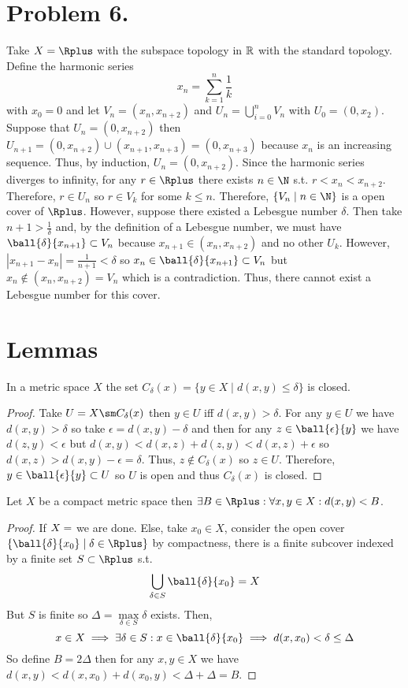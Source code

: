\documentclass[12pt]{extarticle}
\begin{document}
\section*{Problem 6.}
Take $X = \Rplus$ with the subspace topology in $\mathbb{R}$ with the standard topology. Define the harmonic series \[x_n = \sum_{k = 1}^n \frac{1}{k}\]
with $x_0 = 0$ and let $V_n = (x_{n}, x_{n+2})$ and $U_n = \bigcup\limits_{i = 0}^n V_n$ with $U_0 = (0, x_2)$. Suppose that $U_n = (0, x_{n+2})$ then $U_{n+1} = (0, x_{n+2}) \cup (x_{n+1}, x_{n+3}) = (0, x_{n+3})$ because $x_n$ is an increasing sequence. Thus, by induction, $U_{n} = (0, x_{n+2})$. Since the harmonic series diverges to infinity, for any $r \in \Rplus$ there exists $n \in \N$ s.t. $r < x_n < x_{n+2}$. Therefore, $r \in U_n$ so $r \in V_k$ for some $k \le n$. Therefore, $\{V_n \mid n \in \N \}$ is a open cover of $\Rplus$. However, suppose there existed a Lebesgue number $\delta$. Then take $n + 1 > \frac{1}{\delta}$ and, by the definition of a Lebesgue number, we must have $\ball{\delta}{x_{n + 1}} \subset V_{n}$ because $x_{n + 1} \in (x_{n}, x_{n+2})$ and no other $U_k$. However, $|x_{n+1} - x_{n}| = \frac{1}{n+1} < \delta$ so $x_{n} \in \ball{\delta}{x_{n + 1}} \subset V_n$ but $x_{n} \notin (x_{n}, x_{n+2}) = V_n$ which is a contradiction. Thus, there cannot exist a Lebesgue number for this cover.   
\section*{Lemmas}

\begin{lemma} \label{closedball}
In a metric space $X$ the set $C_\delta(x) = \{y \in X \mid d(x, y) \le \delta\}$ is closed.
\end{lemma}

\begin{proof}
Take $U = X \sm C_\delta(x)$ then $y \in U$ iff $d(x, y) > \delta$. For any $y \in U$ we have $d(x, y) > \delta$ so take $\epsilon = d(x, y) - \delta$ and then for any $z \in \ball{\epsilon}{y}$ we have $d(z, y) < \epsilon$ but $d(x, y) < d(x, z) + d(z, y) < d(x, z) + \epsilon$ so $d(x, z) > d(x, y) - \epsilon = \delta$. Thus, $z \notin C_\delta(x)$ so $z \in U$. Therefore, $y \in \ball{\epsilon}{y} \subset U$ so $U$ is open and thus $C_\delta(x)$ is closed. 
\end{proof}

\begin{lemma} \label{compactbounded}
Let $X$ be a compact metric space then $\exists B \in \Rplus : \forall x, y \in X : d(x, y) < B$. 
\end{lemma}
\begin{proof}
If $X = \empty$ we are done. Else, take $x_0 \in X$, consider the open cover $\{\ball{\delta}{x_0} \mid \delta \in \Rplus\}$ by compactness, there is a finite subcover indexed by a finite set $S \subset \Rplus$ s.t. \[\bigcup_{\delta \in S} \ball{\delta}{x_0} = X\]
But $S$ is finite so $\Delta = \max\limits_{\delta \in S} {\delta}$ exists. Then, 
\[x \in X \implies \exists \delta \in S : x \in \ball{\delta}{x_0} \implies d(x, x_0) < \delta \le \Delta\]  
So define $B = 2 \Delta$ then for any $x, y \in X$ we have $d(x, y) < d(x, x_0) + d(x_0, y) < \Delta + \Delta  = B$. 
\end{proof}
\end{document}
